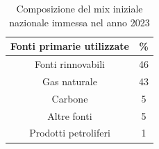\begin{table}
    \renewcommand{\arraystretch}{2}
    \centering
    \begin{tabular}{c|c}
         Fonti primarie utilizzate	& \% \\
         \hline
         Fonti rinnovabili & 46 \\
         Gas naturale& 43 \\
         Carbone& 5 \\
         Altre fonti & 5 \\
         Prodotti petroliferi& 1 \\
    \end{tabular}
    \caption{Composizione del mix iniziale nazionale immessa nel anno 2023 \cite{GSE}}
    \label{tab:GSE-mix-nazionale-2023}
\end{table}
